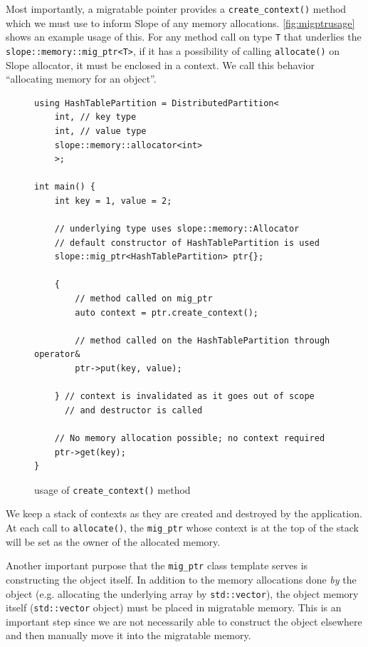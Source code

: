 Most importantly, a migratable pointer provides a \texttt{create\_context()}
method which we must use to inform Slope of any memory allocations.
\autoref{fig:migptrusage} shows an example usage of this. For any method call
on type \texttt{T} that underlies the \texttt{slope::memory::mig\_ptr<T>},
if it has a possibility of calling \texttt{allocate()} on Slope allocator, it
must be enclosed in a context. We call this behavior ``allocating memory for
an object''.


\begin{figure}[tp]
\begin{lstlisting}
using HashTablePartition = DistributedPartition<
    int, // key type
    int, // value type
    slope::memory::allocator<int>
    >;

int main() {
    int key = 1, value = 2;

    // underlying type uses slope::memory::Allocator
    // default constructor of HashTablePartition is used
    slope::mig_ptr<HashTablePartition> ptr{};

    {
        // method called on mig_ptr
        auto context = ptr.create_context();

        // method called on the HashTablePartition through operator&
        ptr->put(key, value);

    } // context is invalidated as it goes out of scope
      // and destructor is called

    // No memory allocation possible; no context required
    ptr->get(key);
}
\end{lstlisting}
\caption{
    usage of \texttt{create\_context()} method
}
\label{fig:migptrusage}
\end{figure}


We keep a stack of contexts as they are created and destroyed by the application.
At each call to \texttt{allocate()}, the \texttt{mig\_ptr} whose context is at
the top of the stack will be set as the owner of the allocated memory.

Another important purpose that the \texttt{mig\_ptr} class template serves is
constructing the object itself. In addition to the memory allocations done
\emph{by} the object (e.g. allocating the underlying array by \texttt{std::vector}),
the object memory itself (\texttt{std::vector} object) must be placed in
migratable memory. This is an important step since we are not necessarily able
to construct the object elsewhere and then manually move it into the migratable
memory.


